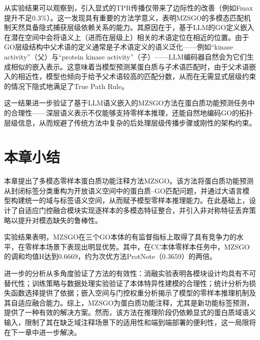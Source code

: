 从实验结果可以观察到，引入显式的TPR传播仅带来了边际性的改善（例如Fmax提升不足0.3\%）。这一发现具有重要的方法学意义，表明MZSGO的多模态匹配机制天然具备隐式捕获层级依赖关系的能力。其原因在于，基于LLM的GO定义嵌入在潜在空间中会将语义上（进而在层级上）相关的术语定位在相近的位置。由于GO层级结构中父术语的定义通常是子术语定义的语义泛化——例如``kinase activity''（父）与``protein kinase activity''（子）——LLM编码器自然会为它们生成相似的嵌入表示。这意味着当模型预测某蛋白质与子术语匹配时，由于父术语嵌入的相近性，模型也倾向于给予父术语较高的匹配分数，从而在无需显式层级约束的情况下隐式地满足了True Path Rule。

这一结果进一步验证了基于LLM语义嵌入的MZSGO方法在蛋白质功能预测任务中的合理性——深层语义表示不仅能够支持零样本推理，还能自然地编码GO的拓扑层级信息，从而规避了传统方法中复杂的后处理层级传播步骤或刚性的架构约束。

\section{本章小结}

本章提出了多模态零样本蛋白质功能注释方法MZSGO。该方法将蛋白质功能预测从封闭标签分类重构为开放语义空间中的蛋白质–GO匹配问题，并通过大语言模型构建统一的域与标签语义空间，从而赋予模型零样本推理能力。在此基础上，设计了自适应门控融合模块实现逐样本的多模态特征整合，并引入非对称特征丢弃策略以提升对模态缺失的鲁棒性。

实验结果表明，MZSGO在三个GO本体的有监督指标上取得了具有竞争力的水平，在零样本场景下表现出明显优势。其中，在CC本体零样本任务中，MZSGO的调和均值H达到0.6669，约为次优方法ProtNote（0.3659）的两倍。

进一步的分析从多角度验证了方法的有效性：消融实验表明各模块设计均具有不可替代性；训练策略与数据处理实验验证了本体特异性建模的合理性；统计分析为损失函数选择提供了依据；嵌入空间与门控权重分析揭示了模型的零样本推理机制及其自适应融合能力。综上，MZSGO为蛋白质功能注释，尤其是新功能标签预测，提供了一种有效的解决方案。然而，该方法在推理阶段仍依赖显式的蛋白质域语义输入，限制了其在缺乏域注释场景下的适用性和端到端部署的便利性，这一局限将在下一章中进一步解决。
